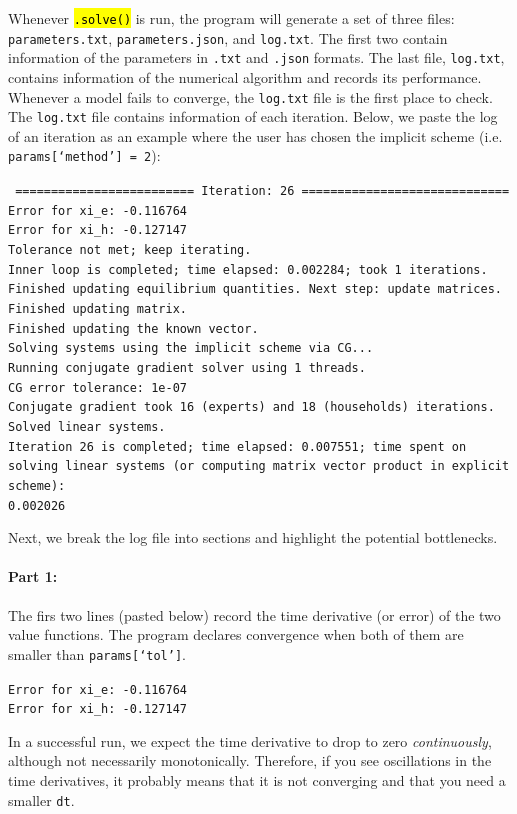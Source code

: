 \documentclass[12pt]{article}
\DeclareRobustCommand{\hlCODE}[1]{{\sethlcolor{backcolour}\hl{#1}}}
\begin{document}
Whenever \hlCODE{\texttt{.solve()}} is run, the program will generate a set of three files: \texttt{parameters.txt}, \texttt{parameters.json}, and \texttt{log.txt}. The first two contain information of the parameters in \texttt{.txt} and \texttt{.json} formats. The last file, \texttt{log.txt}, contains information of the numerical algorithm and records its performance. Whenever a model fails to converge, the \texttt{log.txt} file is the first place to check. The \texttt{log.txt} file contains information of each iteration. Below, we paste the log of an iteration as an example where the user has chosen the implicit scheme (i.e. \texttt{params[`method'] = 2}):\\
\begin{flushleft}
\texttt{
========================= Iteration: 26 =============================\\
Error for xi\_e: -0.116764\\
Error for xi\_h: -0.127147\\
Tolerance not met; keep iterating. \\
Inner loop is completed; time elapsed: 0.002284; took 1 iterations.\\
Finished updating equilibrium quantities. Next step: update matrices.\\
Finished updating matrix.\\
Finished updating the known vector.\\
Solving systems using the implicit scheme via CG...\\
Running conjugate gradient solver using 1 threads.\\
CG error tolerance: 1e-07\\
Conjugate gradient took 16 (experts) and 18 (households) iterations.\\
Solved linear systems.\\
Iteration 26 is completed; time elapsed: 0.007551; time spent on solving linear systems (or computing matrix vector product in explicit scheme):\\ 0.002026\\
}
\end{flushleft}

Next, we break the log file into sections and highlight the potential bottlenecks.

\paragraph{Part 1:} The firs two lines (pasted below) record the time derivative (or error) of the two value functions. The program declares convergence when both of them are smaller than \texttt{params[`tol']}. 
\begin{flushleft}
\texttt{Error for xi\_e: -0.116764\\
Error for xi\_h: -0.127147\\
}
\end{flushleft}
In a successful run, we expect the time derivative to drop to zero \textit{continuously}, although not necessarily monotonically. Therefore, if you see oscillations in the time derivatives, it probably means that it is not converging and that you need a smaller \texttt{dt}.
\end{document}
